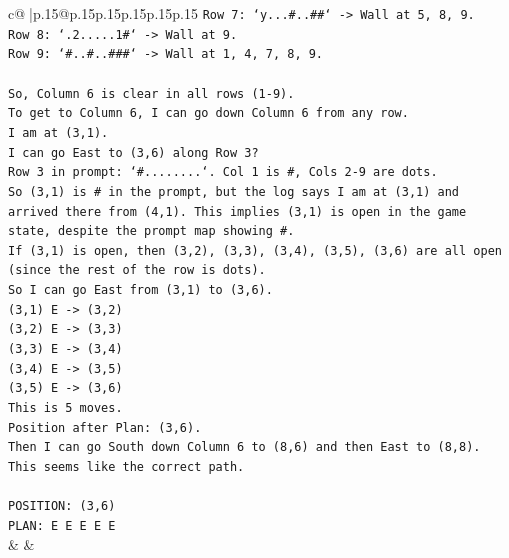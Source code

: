 \documentclass{article}
\begin{document}
{\begin{supertabular}{c@{$\;$}|p{.15\linewidth}@{}p{.15\linewidth}p{.15\linewidth}p{.15\linewidth}p{.15\linewidth}p{.15\linewidth}}
{{{\texttt{Row 7: `y...\#..\#\#` {-}> Wall at 5, 8, 9.} \\
\texttt{Row 8: `.2.....1\#` {-}> Wall at 9.} \\
\texttt{Row 9: `\#..\#..\#\#\#` {-}> Wall at 1, 4, 7, 8, 9.} \\
\\ 
\texttt{So, Column 6 is clear in all rows (1{-}9).} \\
\texttt{To get to Column 6, I can go down Column 6 from any row.} \\
\texttt{I am at (3,1).} \\
\texttt{I can go East to (3,6) along Row 3?} \\
\texttt{Row 3 in prompt: `\#........`. Col 1 is \#, Cols 2{-}9 are dots.} \\
\texttt{So (3,1) is \# in the prompt, but the log says I am at (3,1) and arrived there from (4,1). This implies (3,1) is open in the game state, despite the prompt map showing \#.} \\
\texttt{If (3,1) is open, then (3,2), (3,3), (3,4), (3,5), (3,6) are all open (since the rest of the row is dots).} \\
\texttt{So I can go East from (3,1) to (3,6).} \\
\texttt{(3,1) E {-}> (3,2)} \\
\texttt{(3,2) E {-}> (3,3)} \\
\texttt{(3,3) E {-}> (3,4)} \\
\texttt{(3,4) E {-}> (3,5)} \\
\texttt{(3,5) E {-}> (3,6)} \\
\texttt{This is 5 moves.} \\
\texttt{Position after Plan: (3,6).} \\
\texttt{Then I can go South down Column 6 to (8,6) and then East to (8,8).} \\
\texttt{This seems like the correct path.} \\
\\ 
\texttt{POSITION: (3,6)} \\
\texttt{PLAN: E E E E E} \\
            }
        }
    }
    & & \\ \\


\end{supertabular}}
\end{document}
